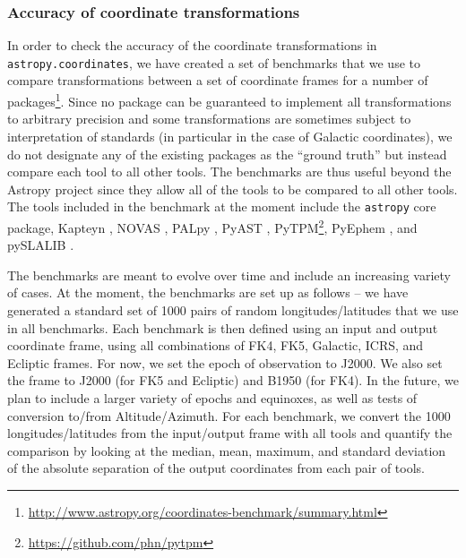 \documentclass[modern]{aastex61}
\newcommand{\package}[1]{\texttt{#1}\xspace}
\newcommand{\astropy}{Astropy\xspace}
\newcommand{\astropypkg}{\package{astropy}}
\begin{document}
\subsubsection{Accuracy of coordinate transformations}

In order to check the accuracy of the coordinate transformations in
\package{astropy.coordinates}, we have created a set of benchmarks that we use
to compare transformations between a set of coordinate frames for a number of
packages\footnote{\url{http://www.astropy.org/coordinates-benchmark/summary.html}}.
Since no package can be guaranteed to implement all transformations to
arbitrary precision and some transformations are sometimes subject to
interpretation of standards (in particular in the case of Galactic coordinates),
we do not designate any of the existing packages as the ``ground truth'' but
instead compare each tool to all other tools. The benchmarks are thus useful
beyond the \astropy project since they allow all of the tools to be compared to
all other tools. The tools included in the benchmark at the moment include the
\astropypkg core package, Kapteyn \citep{kapteyn}, NOVAS \citep{novas},
PALpy \citep{pal}, PyAST \citep[a wrapper for AST, described in][]{ast},
PyTPM\footnote{\url{https://github.com/phn/pytpm}}, PyEphem \citep{pyephem},
and pySLALIB \citep[a Python wrapper for SLALIB, described in][]{slalib}.

The benchmarks are meant to evolve over time and include an increasing variety
of cases. At the moment, the benchmarks are set up as follows --
we have generated a standard set of 1000 pairs of random longitudes/latitudes
that we use in all benchmarks. Each benchmark is then defined using an input
and output coordinate frame, using all combinations of FK4, FK5, Galactic,
ICRS, and Ecliptic frames. For now, we set the epoch of observation to J2000.
We also set the frame to J2000 (for FK5 and Ecliptic) and B1950 (for FK4).
In the future, we plan to include a larger variety of epochs and equinoxes,
as well as tests of conversion to/from Altitude/Azimuth. For each benchmark,
we convert the 1000 longitudes/latitudes from the input/output frame with all
tools and quantify the comparison by looking at the median, mean, maximum,
and standard deviation of the absolute separation of the output coordinates
from each pair of tools.
\end{document}
